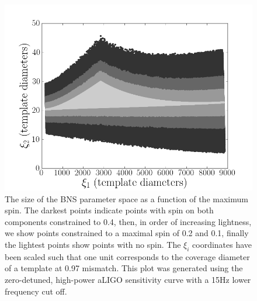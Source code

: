 \begin{figure}
\begin{center}
\includegraphics[width=1.0\textwidth]{papers/bns_spin/figure4.png}
\end{center}
\caption{\label{fig:param_space_spin} The size of the BNS parameter space as a function of the maximum spin.
The darkest points indicate points with spin on both components constrained to 0.4, then, in order of
increasing lightness, we show points constrained
to a maximal spin of 0.2 and 0.1, finally the lightest points show points with no spin. 
The $\xi_i$ coordinates have been scaled
such that one unit corresponds to the coverage diameter of a template
at 0.97 mismatch.
This plot was generated
using the zero-detuned, high-power aLIGO sensitivity curve with a 15Hz lower frequency cut off.}
\end{figure}

